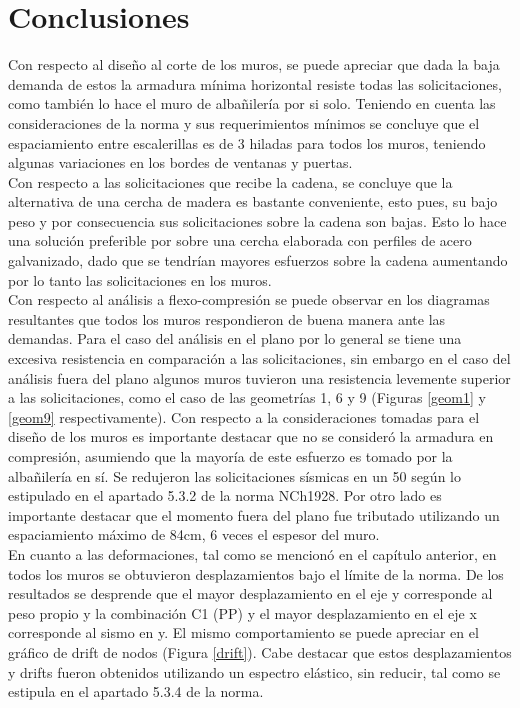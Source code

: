 \newpage
\section{Conclusiones}

Con respecto al diseño al corte de los muros, se puede apreciar que dada la baja demanda de estos la armadura mínima horizontal resiste todas las solicitaciones, como también lo hace el muro de albañilería por si solo. Teniendo en cuenta las consideraciones de la norma y sus requerimientos mínimos se concluye que el espaciamiento entre escalerillas es de 3 hiladas para todos los muros, teniendo algunas variaciones en los bordes de ventanas y puertas.\\

Con respecto a las solicitaciones que recibe la cadena, se concluye que la alternativa de una cercha de madera es bastante conveniente, esto pues, su bajo peso y por consecuencia sus solicitaciones sobre la cadena son bajas. Esto lo hace una solución preferible por sobre una cercha elaborada con perfiles de acero galvanizado, dado que se tendrían mayores esfuerzos sobre la cadena aumentando por lo tanto las solicitaciones en los muros. \\

Con respecto al análisis a flexo-compresión se puede observar en los diagramas resultantes que todos los muros respondieron de buena manera ante las demandas. Para el caso del análisis en el plano por lo general se tiene una excesiva resistencia en comparación a las solicitaciones, sin embargo en el caso del análisis fuera del plano algunos muros tuvieron una resistencia levemente superior a las solicitaciones, como el caso de las geometrías 1, 6 y 9 (Figuras \ref{geom1} y \ref{geom9} respectivamente). Con respecto a la consideraciones tomadas para el diseño de los muros es importante destacar que no se consideró la armadura en compresión, asumiendo que la mayoría de este esfuerzo es tomado por la albañilería en sí. Se redujeron las solicitaciones sísmicas en un 50 según lo estipulado en el apartado 5.3.2 de la norma NCh1928. Por otro lado es importante destacar que el momento fuera del plano fue tributado utilizando un espaciamiento máximo de 84cm, 6 veces el espesor del muro. \\

En cuanto a las deformaciones, tal como se mencionó en el capítulo anterior, en todos los muros se obtuvieron desplazamientos bajo el límite de la norma. De los resultados se desprende que el mayor desplazamiento en el eje y corresponde al peso propio y la combinación C1 (PP) y el mayor desplazamiento en el eje x corresponde al sismo en y. El mismo comportamiento se puede apreciar en el gráfico de drift de nodos (Figura \ref{drift}). Cabe destacar que estos desplazamientos y drifts fueron obtenidos utilizando un espectro elástico, sin reducir, tal como se estipula en el apartado 5.3.4 de la norma.